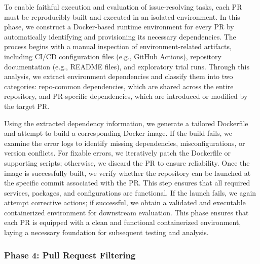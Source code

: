 \documentclass[11pt, a4paper, logo, copyright, nonumbering]{seed}
\begin{document}
To enable faithful execution and evaluation of issue-resolving tasks, each PR must be reproducibly built and executed in an isolated environment.
In this phase, we construct a Docker-based runtime environment for every PR by automatically identifying and provisioning its necessary dependencies.
The process begins with a manual inspection of environment-related artifacts, including CI/CD configuration files (e.g., GitHub Actions), repository documentation (e.g., README files), and exploratory trial runs.
Through this analysis, we extract environment dependencies and classify them into two categories: repo-common dependencies, which are shared across the entire repository, and PR-specific dependencies, which are introduced or modified by the target PR.

Using the extracted dependency information, we generate a tailored Dockerfile and attempt to build a corresponding Docker image.
If the build fails, we examine the error logs to identify missing dependencies, misconfigurations, or version conflicts. For fixable errors, we iteratively patch the Dockerfile or supporting scripts; otherwise, we discard the PR to ensure reliability.
Once the image is successfully built, we verify whether the repository can be launched at the specific commit associated with the PR. 
This step ensures that all required services, packages, and configurations are functional.
If the launch fails, we again attempt corrective actions; if successful, we obtain a validated and executable containerized environment for downstream evaluation.
This phase ensures that each PR is equipped with a clean and functional containerized environment, laying a necessary foundation for subsequent testing and analysis.



\subsubsection{Phase 4: Pull Request Filtering}
\end{document}
